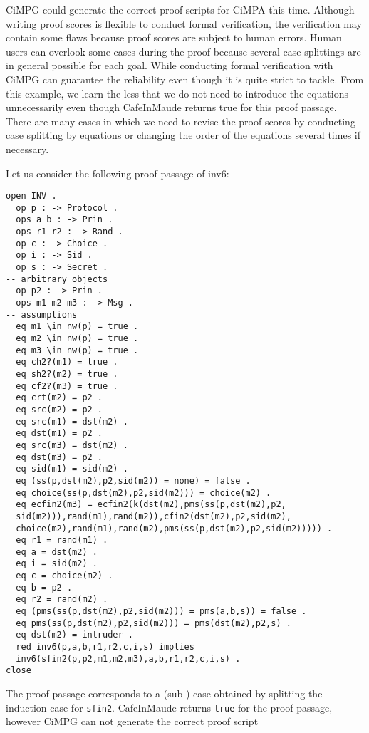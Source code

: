 \documentclass[a4paper,fleqn]{cas-dc}
\begin{document}
CiMPG could generate the correct proof scripts for CiMPA this time. Although writing proof scores is flexible to conduct formal verification, the verification may contain some flaws because proof scores are subject to human errors. Human users can overlook some cases during the proof because several case splittings are in general possible for each goal. While conducting formal verification with CiMPG can guarantee the reliability even though it is quite strict to tackle. From this example, we learn the less that we do not need to introduce the equations unnecessarily even though CafeInMaude returns true for this proof passage. There are many cases in which we need to revise the proof scores by conducting case splitting by equations or changing the order of the equations several times if necessary. 

Let us consider the following proof passage of inv6:
\begin{small}
\begin{verbatim}
open INV .
  op p : -> Protocol .
  ops a b : -> Prin .
  ops r1 r2 : -> Rand .
  op c : -> Choice .
  op i : -> Sid .
  op s : -> Secret .
-- arbitrary objects
  op p2 : -> Prin .
  ops m1 m2 m3 : -> Msg .
-- assumptions
  eq m1 \in nw(p) = true .
  eq m2 \in nw(p) = true .
  eq m3 \in nw(p) = true .
  eq ch2?(m1) = true .
  eq sh2?(m2) = true .
  eq cf2?(m3) = true .
  eq crt(m2) = p2 .
  eq src(m2) = p2 .
  eq src(m1) = dst(m2) .
  eq dst(m1) = p2 .
  eq src(m3) = dst(m2) .
  eq dst(m3) = p2 .
  eq sid(m1) = sid(m2) .
  eq (ss(p,dst(m2),p2,sid(m2)) = none) = false .
  eq choice(ss(p,dst(m2),p2,sid(m2))) = choice(m2) .
  eq ecfin2(m3) = ecfin2(k(dst(m2),pms(ss(p,dst(m2),p2,
  sid(m2))),rand(m1),rand(m2)),cfin2(dst(m2),p2,sid(m2),
  choice(m2),rand(m1),rand(m2),pms(ss(p,dst(m2),p2,sid(m2))))) .
  eq r1 = rand(m1) .
  eq a = dst(m2) .
  eq i = sid(m2) .
  eq c = choice(m2) .
  eq b = p2 .
  eq r2 = rand(m2) .
  eq (pms(ss(p,dst(m2),p2,sid(m2))) = pms(a,b,s)) = false .
  eq pms(ss(p,dst(m2),p2,sid(m2))) = pms(dst(m2),p2,s) .
  eq dst(m2) = intruder .
  red inv6(p,a,b,r1,r2,c,i,s) implies
  inv6(sfin2(p,p2,m1,m2,m3),a,b,r1,r2,c,i,s) .
close
\end{verbatim}
\end{small}
The proof passage corresponds to a (sub-) case obtained by splitting the induction case for \verb!sfin2!. CafeInMaude returns \verb!true! for the proof passage, however CiMPG can not generate the correct proof script




	
\end{document}
